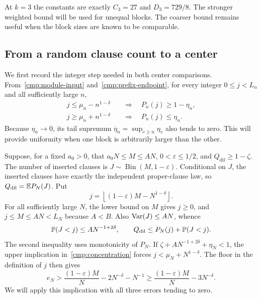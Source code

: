 At $k=3$ the constants are exactly $C_3=27$ and $D_3=729/8$.
The stronger weighted bound will be used for unequal blocks.  The coarser
bound remains useful when the block sizes are known to be comparable.

\subsection{From a random clause count to a center}

We first record the integer step needed in both center comparisons.
From~\eqref{cmp:module-input} and~\eqref{cmp:prefix-endpoint}, for every
integer $0\le j<L_n$ and all sufficiently large $n$,
\begin{equation}\label{cmp:concentration}
 \begin{aligned}
 j\le\mu_n-n^{1-\delta}&\quad\Longrightarrow\quad P_n(j)\ge1-\eta_n,\\
 j\ge\mu_n+n^{1-\delta}&\quad\Longrightarrow\quad P_n(j)\le\eta_n.
 \end{aligned}
\end{equation}
Because $\eta_n\to0$, its tail supremum
$\overline\eta_n=\sup_{v\ge n}\eta_v$ also tends to zero.  This will
provide uniformity when one block is arbitrarily larger than the other.

Suppose, for a fixed $a_0>0$, that
$a_0N\le M\le AN$, $0<\varepsilon\le1/2$, and
$Q_{\mathrm{dil}}\ge1-\zeta$.  The number of inserted clauses is
$J\sim\operatorname{Bin}(M,1-\varepsilon)$.  Conditional on $J$, the
inserted clauses have exactly the independent proper-clause law, so
$Q_{\mathrm{dil}}=\mathbb E P_N(J)$.  Put
\[
 j=\left\lfloor(1-\varepsilon)M-N^{1-\delta}\right\rfloor.
\]
For all sufficiently large $N$, the lower bound on $M$ gives $j\ge0$,
and $j\le M\le AN<L_N$ because $A<B$.  Also $\operatorname{Var}(J)\le AN$, whence
\[
 \mathbb P(J<j)\le A N^{-1+2\delta},\qquad
 Q_{\mathrm{dil}}\le P_N(j)+\mathbb P(J<j).
\]
The second inequality uses monotonicity of $P_N$.  If
$\zeta+AN^{-1+2\delta}+\eta_N<1$, the upper implication
in~\eqref{cmp:concentration} forces $j<\mu_N+N^{1-\delta}$.
The floor in the definition of $j$ then gives
\begin{equation}\label{cmp:count-transfer}
 e_N>\frac{(1-\varepsilon)M}{N}-2N^{-\delta}-N^{-1}
 \ge\frac{(1-\varepsilon)M}{N}-3N^{-\delta}.
\end{equation}
We will apply this implication with all three errors tending to zero.

